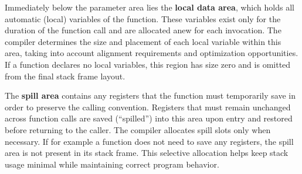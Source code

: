 
Immediately below the parameter area lies the \textbf{local data area}, which holds all automatic (local) variables of the function. These variables exist only for the duration of the function call and are allocated anew for each invocation. The compiler determines the size and placement of each local variable within this area, taking into account alignment requirements and optimization opportunities. If a function declares no local variables, this region has size zero and is omitted from the final stack frame layout.


The \textbf{spill area} contains any registers that the function must temporarily save in order to preserve the calling convention. Registers that must remain unchanged across function calls are saved (``spilled'') into this area upon entry and restored before returning to the caller. The compiler allocates spill slots only when necessary. If for example a function does not need to save any registers, the spill area is not present in its stack frame. This selective allocation helps keep stack usage minimal while maintaining correct program behavior.


